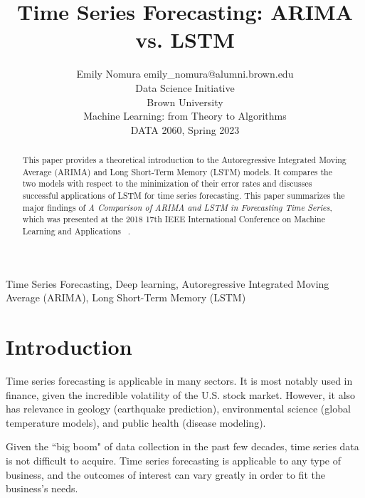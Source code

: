 \documentclass[twoside,11pt]{article}
\begin{document}
\title{Time Series Forecasting: ARIMA vs. LSTM}

\author{\name Emily Nomura \email emily\_nomura@alumni.brown.edu \\
       \addr Data Science Initiative\\
       Brown University\\
       Machine Learning: from Theory to Algorithms\\
       DATA 2060, Spring 2023\\
       }

\maketitle

\begin{abstract}%
This paper provides a theoretical introduction to the Autoregressive Integrated Moving Average (ARIMA) and Long Short-Term Memory (LSTM) models. It compares the two models with respect to the minimization of their error rates and discusses successful applications of LSTM for time series forecasting. This paper summarizes the major findings of \textit{A Comparison of ARIMA and LSTM in Forecasting Time Series}, which was presented at the 2018 17th IEEE International Conference on Machine Learning and Applications ~\citep{siami-namini:2018}.
\end{abstract}

\begin{keywords}
  Time Series Forecasting, Deep learning, Autoregressive Integrated Moving Average (ARIMA), Long Short-Term Memory (LSTM)
\end{keywords}

\section{Introduction}
Time series forecasting is applicable in many sectors. It is most notably used in finance, given the incredible volatility of the U.S. stock market. However, it also has relevance in geology (earthquake prediction), environmental science (global temperature models), and public health (disease modeling).

Given the ``big boom" of data collection in the past few decades, time series data is not difficult to acquire. Time series forecasting is applicable to any type of business, and the outcomes of interest can vary greatly in order to fit the business's needs.
\end{document}
